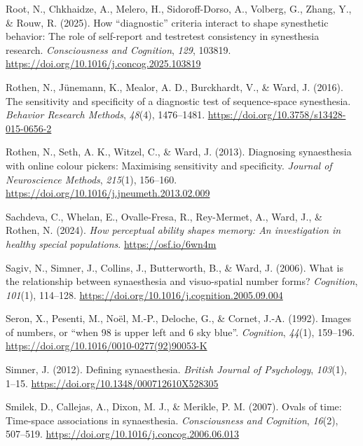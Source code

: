 \documentclass[
  man,
  floatsintext,
  longtable,
  a4paper,
  nolmodern,
  notxfonts,
  notimes,
  colorlinks=true,linkcolor=blue,citecolor=blue,urlcolor=blue]{apa7}
\newlength{\cslhangindent}
\newenvironment{CSLReferences}[2] %
 {\begin{list}{}{%
  \setlength{\itemindent}{0pt}
  \setlength{\leftmargin}{0pt}
  \setlength{\parsep}{0pt}
  \ifodd #1
   \setlength{\leftmargin}{\cslhangindent}
   \setlength{\itemindent}{-1\cslhangindent}
  \fi
  \setlength{\itemsep}{#2\baselineskip}}}
 {\end{list}}
\begin{document}
\begin{CSLReferences}{1}{0}
Root, N., Chkhaidze, A., Melero, H., Sidoroff-Dorso, A., Volberg, G.,
Zhang, Y., \& Rouw, R. (2025). How {``}diagnostic{''} criteria interact
to shape synesthetic behavior: The role of self-report and
test{\textendash}retest consistency in synesthesia research.
\emph{Consciousness and Cognition}, \emph{129}, 103819.
\url{https://doi.org/10.1016/j.concog.2025.103819}

Rothen, N., Jünemann, K., Mealor, A. D., Burckhardt, V., \& Ward, J.
(2016). The sensitivity and specificity of a diagnostic test of
sequence-space synesthesia. \emph{Behavior Research Methods},
\emph{48}(4), 1476--1481.
\url{https://doi.org/10.3758/s13428-015-0656-2}

Rothen, N., Seth, A. K., Witzel, C., \& Ward, J. (2013). Diagnosing
synaesthesia with online colour pickers: Maximising sensitivity and
specificity. \emph{Journal of Neuroscience Methods}, \emph{215}(1),
156--160. \url{https://doi.org/10.1016/j.jneumeth.2013.02.009}

Sachdeva, C., Whelan, E., Ovalle-Fresa, R., Rey-Mermet, A., Ward, J., \&
Rothen, N. (2024). \emph{How perceptual ability shapes memory: An
investigation in healthy special populations}.
\url{https://osf.io/6wn4m}

Sagiv, N., Simner, J., Collins, J., Butterworth, B., \& Ward, J. (2006).
What is the relationship between synaesthesia and visuo-spatial number
forms? \emph{Cognition}, \emph{101}(1), 114--128.
\url{https://doi.org/10.1016/j.cognition.2005.09.004}

Seron, X., Pesenti, M., Noël, M.-P., Deloche, G., \& Cornet, J.-A.
(1992). Images of numbers, or {``}when 98 is upper left and 6 sky
blue{''}. \emph{Cognition}, \emph{44}(1), 159--196.
\url{https://doi.org/10.1016/0010-0277(92)90053-K}

Simner, J. (2012). Defining synaesthesia. \emph{British Journal of
Psychology}, \emph{103}(1), 1--15.
\url{https://doi.org/10.1348/000712610X528305}

Smilek, D., Callejas, A., Dixon, M. J., \& Merikle, P. M. (2007). Ovals
of time: Time-space associations in synaesthesia. \emph{Consciousness
and Cognition}, \emph{16}(2), 507--519.
\url{https://doi.org/10.1016/j.concog.2006.06.013}


\end{CSLReferences}
\end{document}
